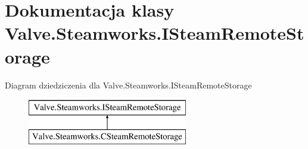 \hypertarget{class_valve_1_1_steamworks_1_1_i_steam_remote_storage}{}\section{Dokumentacja klasy Valve.\+Steamworks.\+I\+Steam\+Remote\+Storage}
\label{class_valve_1_1_steamworks_1_1_i_steam_remote_storage}
Diagram dziedziczenia dla Valve.\+Steamworks.\+I\+Steam\+Remote\+Storage\begin{figure}[H]
\begin{center}
\leavevmode
\includegraphics[height=2.000000cm]{class_valve_1_1_steamworks_1_1_i_steam_remote_storage}
\end{center}
\end{figure}

